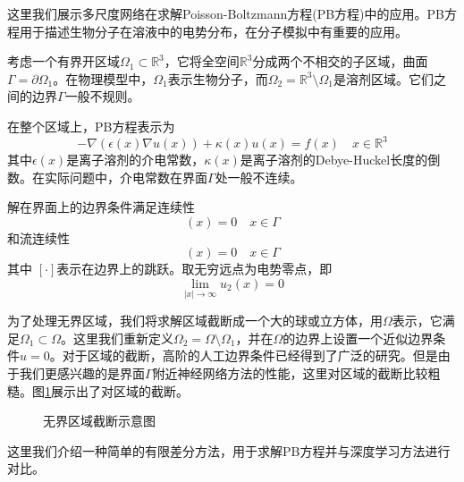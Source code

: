

这里我们展示多尺度网络在求解Poisson-Boltzmann方程(PB方程)中的应用。PB方程用于描述生物分子在溶液中的电势分布，在分子模拟中有重要的应用。


考虑一个有界开区域$\Omega_1 \subset \mathbb{R}^3$，它将全空间$\mathbb{R}^3$分成两个不相交的子区域，曲面$\Gamma=\partial\Omega_1$。在物理模型中，$\Omega_1$表示生物分子，而$\Omega_2=\mathbb{R}^3\setminus\Omega_1$是溶剂区域。它们之间的边界$\Gamma$一般不规则。

在整个区域上，PB方程表示为
\begin{equation}
-\nabla(\epsilon(x)\nabla u(x))+\kappa(x)u(x)=f(x) \quad x \in \mathbb{R}^{3} \label{prob}
\end{equation}
其中$\epsilon(x)$是离子溶剂的介电常数，$\kappa(x)$是离子溶剂的Debye-Huckel长度的倒数。在实际问题中，介电常数在界面$\Gamma$处一般不连续。

解在界面上的边界条件满足连续性
\begin{equation}
[u](x)  = 0 \quad x \in \Gamma
\end{equation}
和流连续性
\begin{equation}
[\epsilon \frac{\partial u}{\partial n}](x) = 0 \quad x \in \Gamma
\end{equation}
其中 $[\cdot]$表示在边界上的跳跃。取无穷远点为电势零点，即
\begin{equation}
\lim_{|x| \rightarrow\infty} u_2(x) = 0
\end{equation}

为了处理无界区域，我们将求解区域截断成一个大的球或立方体，用$\Omega$表示，它满足$\Omega_1 \subset \Omega$。这里我们重新定义$\Omega_2=\Omega\setminus\Omega_1$，并在$\Omega$的边界上设置一个近似边界条件$u=0$。对于区域的截断，高阶的人工边界条件已经得到了广泛的研究。但是由于我们更感兴趣的是界面$\Gamma$附近神经网络方法的性能，这里对区域的截断比较粗糙。图\ref{regt}展示出了对区域的截断。
\begin{figure}[htbp]
\centering
{}
\caption{无界区域截断示意图}
\label{regt}
\end{figure}


这里我们介绍一种简单的有限差分方法，用于求解PB方程并与深度学习方法进行对比。

